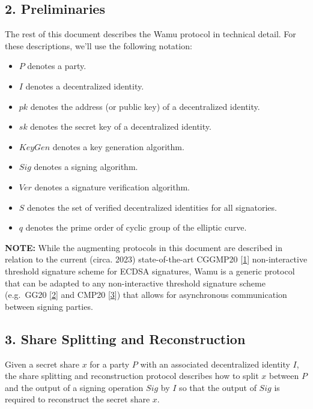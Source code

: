 \documentclass[
]{article}
\providecommand{\tightlist}{%
  \setlength{\itemsep}{0pt}\setlength{\parskip}{0pt}}
\begin{document}
\hypertarget{preliminaries}{%
\subsection{2. Preliminaries}\label{preliminaries}}

The rest of this document describes the Wamu protocol in technical
detail. For these descriptions, we'll use the following notation:

\begin{itemize}
\tightlist
\item
  \(P\) denotes a party.
\item
  \(I\) denotes a decentralized identity.
\item
  \(pk\) denotes the address (or public key) of a decentralized
  identity.
\item
  \(sk\) denotes the secret key of a decentralized identity.
\item
  \(KeyGen\) denotes a key generation algorithm.
\item
  \(Sig\) denotes a signing algorithm.
\item
  \(Ver\) denotes a signature verification algorithm.
\item
  \(S\) denotes the set of verified decentralized identities for all
  signatories.
\item
  \(q\) denotes the prime order of cyclic group of the elliptic curve.
\end{itemize}

\textbf{NOTE:} While the augmenting protocols in this document are
described in relation to the current (circa. 2023) state-of-the-art
CGGMP20 {[}\protect\hyperlink{ref-cggmp20}{1}{]} non-interactive
threshold signature scheme for ECDSA signatures, Wamu is a generic
protocol that can be adapted to any non-interactive threshold signature
scheme (e.g.~GG20 {[}\protect\hyperlink{ref-gg20}{2}{]} and CMP20
{[}\protect\hyperlink{ref-cmp20}{3}{]}) that allows for asynchronous
communication between signing parties.

\hypertarget{share-splitting-and-reconstruction}{%
\subsection{3. Share Splitting and
Reconstruction}\label{share-splitting-and-reconstruction}}

Given a secret share \(x\) for a party \(P\) with an associated
decentralized identity \(I\), the share splitting and reconstruction
protocol describes how to split \(x\) between \(P\) and the output of a
signing operation \(Sig\) by \(I\) so that the output of \(Sig\) is
required to reconstruct the secret share \(x\).
\end{document}
